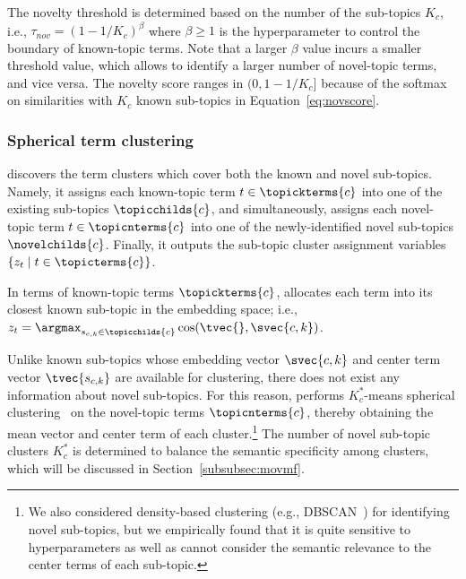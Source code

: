 The novelty threshold is determined based on the number of the sub-topics $K_c$, i.e., $\tau_{nov} = \left(1-{1}/{K_c} \right)^\beta$ where $\beta\geq1$ is the hyperparameter to control the boundary of known-topic terms.
Note that a larger $\beta$ value incurs a smaller threshold value, which allows to identify a larger number of novel-topic terms, and vice versa.
The novelty score ranges in $(0, 1-{1}/{K_c}]$ because of the softmax on similarities with $K_c$ known sub-topics in Equation~\eqref{eq:novscore}.

\subsubsection{Spherical term clustering}
\label{subsubsec:clustering}
\proposed discovers the term clusters which cover both the known and novel sub-topics.
Namely, it assigns each known-topic term $t\in\topickterms{c}$ into one of the existing sub-topics $\topicchilds{c}$, and simultaneously, assigns each novel-topic term $t\in\topicnterms{c}$ into one of the newly-identified novel sub-topics $\novelchilds{c}$.
Finally, it outputs the sub-topic cluster assignment variables $\{z_t\mid t\in\topicterms{c}\}$.

In terms of known-topic terms $\topickterms{c}$, \proposed allocates each term into its closest known sub-topic in the embedding space;
i.e., $z_t = \argmax_{s_{c,k}\in\topicchilds{c}} \cos(\tvec{}, \svec{c, k})$.

Unlike known sub-topics whose embedding vector $\svec{c,k}$ and center term vector $\tvec{s_{c,k}}$ are available for clustering, there does not exist any information about novel sub-topics.
For this reason, \proposed performs $K_c^*$-means spherical clustering~\cite{dhillon2001concept} on the novel-topic terms $\topicnterms{c}$, thereby obtaining the mean vector and center term of each cluster.\footnote{We also considered density-based clustering (e.g., DBSCAN~\cite{campello2015hierarchical}) for identifying novel sub-topics, but we empirically found that it is quite sensitive to hyperparameters as well as cannot consider the semantic relevance to the center terms of each sub-topic.}
The number of novel sub-topic clusters $K_c^*$ is determined to balance the semantic specificity among clusters, which will be discussed in Section~\ref{subsubsec:movmf}.


